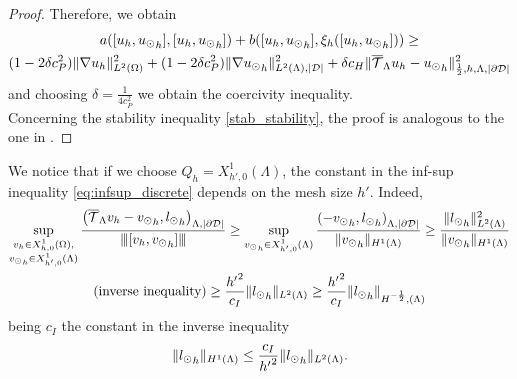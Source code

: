 \begin{proof}
Therefore, we obtain
\begin{multline*}
a([u_h, {u_{\odot}}_h],[u_h, {u_{\odot}}_h] ) + b([u_h, {u_{\odot}}_h], \xi_h([u_h, {u_{\odot}}_h]))
\geq \\
(1-2\delta c_P^2) \|\nabla u_h\|^2_{L^2(\Omega)} + (1- 2\delta c_P^2) \|\nabla {u_{\odot}}_h\|^2_{L^2(\Lambda), |\mathcal{D}|}
+\delta c_H  \|{\overline{\mathcal{T}}_\Lambda} u_h-{u_{\odot}}_h\|^2_{\frac 12,h,\Lambda, |\partial\mathcal{D}|}
\end{multline*}
and choosing $\delta=\frac{1}{4c_P^2}$ we obtain the coercivity inequality.\\
Concerning the stability inequality \eqref{stab_stability}, the proof is analogous to the one in \cite{burman2014}.
\end{proof}

\begin{remark}
We notice that if we choose $Q_h=X_{h',0}^1(\Lambda)$, the constant in the inf-sup inequality  \eqref{eq:infsup_discrete} depends on the mesh size $h'$. Indeed,
\begin{multline}
\sup_{\substack{v_h \in X_{h,0}^1(\Omega),\\ {v_{\odot}}_h \in X_{h',0}^1(\Lambda)}} \frac{\left({\overline{\mathcal{T}}_\Lambda} v_h - {v_{\odot}}_h, {l_{\odot}} _h\right)_{\Lambda, |\partial\mathcal{D}|}}{{\left\vert\kern-0.25ex\left\vert\kern-0.25ex\left\vert [v_h, {v_{\odot}}_h] \right\vert\kern-0.25ex\right\vert\kern-0.25ex\right\vert}}
\geq \sup_{\substack{{v_{\odot}}_h \in X_{h',0}^1(\Lambda)}} \frac{\left(- {v_{\odot}}_h, {l_{\odot}} _h\right)_{\Lambda, |\partial\mathcal{D}|}}{\|{v_{\odot}}_h\|_{H^1(\Lambda)}}
\geq \frac{{\|l_{\odot}} _h\|^2_{L^2(\Lambda)}}{\|{v_{\odot}}_h\|_{H^1(\Lambda)}} \\
( \text{inverse inequality} )\geq \frac{{h'}^2}{c_I} \|{l_{\odot}}_h\|_{L^2(\Lambda)}
\geq  \frac{{h'}^2}{c_I} \|{l_{\odot}}_h\|_{H^{-\frac 12},(\Lambda)}
\end{multline}
being $c_I$ the constant in the inverse inequality
\begin{equation*}
\|{l_{\odot}}_h\|_{H^1(\Lambda)} \leq \frac{c_I} {{h'}^2} \|{l_{\odot}}_h\|_{L^2(\Lambda)}. 
\end{equation*}
\end{remark}
